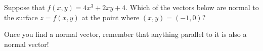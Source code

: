 \documentclass{ximera}
\author{Jim Talamo}
\begin{document}
\begin{exercise}

Suppose that $f(x,y) = 4x^3+2xy+4$. Which of the vectors below are normal to the surface $z=f(x,y)$ at the point where $(x,y)=(-1,0)$? 

\begin{selectAll}
\end{selectAll}

\begin{hint}
Once you find a normal vector, remember that anything parallel to it is also a normal vector!
\end{hint}
\end{exercise}
\end{document}
